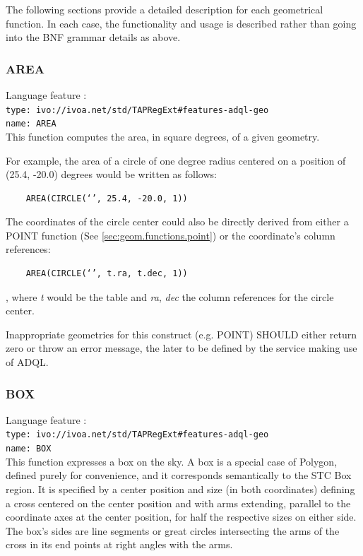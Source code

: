 \documentclass[11pt,a4paper]{ivoa}
\begin{document}
The following sections provide a detailed description for each geometrical
function. In each case, the functionality and usage is described rather
than going into the BNF grammar details as above.

\subsubsection{AREA}
\label{sec:geom.functions.area}
{\footnotesize Language feature :}\\
{\footnotesize \verb|type: ivo://ivoa.net/std/TAPRegExt#features-adql-geo|}\\
{\footnotesize \verb|name: AREA|}\\

This function computes the area, in square degrees, of a given geometry.

For example, the area of a circle of one degree radius centered on a position
of (25.4, -20.0) degrees would be written as follows:

\begin{verbatim}
    AREA(CIRCLE(‘’, 25.4, -20.0, 1))
\end{verbatim}

The coordinates of the circle center could also be directly derived from
either a POINT function (See \ref{sec:geom.functions.point}) or
the coordinate’s column references:

\begin{verbatim}
    AREA(CIRCLE(‘’, t.ra, t.dec, 1))
\end{verbatim}

, where \textit{t} would be the table and \textit{ra}, \textit{dec} the
column references for the circle center.

Inappropriate geometries for this construct (e.g. POINT) SHOULD either return
zero or throw an error message, the later to be defined by the service making
use of ADQL.

\subsubsection{BOX}
\label{sec:geom.functions.box}
{\footnotesize Language feature :}\\
{\footnotesize \verb|type: ivo://ivoa.net/std/TAPRegExt#features-adql-geo|}\\
{\footnotesize \verb|name: BOX|}\\

This function expresses a box on the sky. A box is a special case of Polygon,
defined purely for convenience, and it corresponds semantically to the STC Box
region. It is specified by a center position and size
(in both coordinates) defining a cross centered on the center position and
with arms extending, parallel to the coordinate axes at the center position,
for half the respective sizes on either side. The box’s sides are line
segments or great circles intersecting the arms of the cross in its end
points at right angles with the arms.
\end{document}
